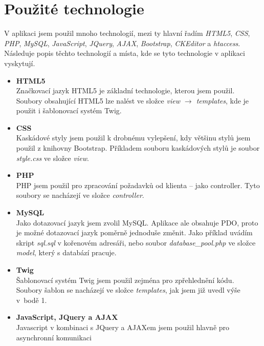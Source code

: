 \documentclass[a4paper]{article}
\begin{document}
	\section{Pou\v{z}it\'e technologie}
		V aplikaci jsem pou\v{z}il mnoho technologi\'i, mezi ty hlavn\'i \v{r}ad\'im \textit{HTML5}, \textit{CSS},
		\textit{PHP}, \textit{MySQL}, \textit{JavaScript}, \textit{JQuery}, \textit{AJAX}, \textit{Bootstrap},
		\textit{CKEditor} a \textit{htaccess}. N\'asleduje popis t\v{e}chto technologi\'i a m\'ista, kde se tyto
		technologie v aplikaci vyskytuj\'i.
		\begin{itemize}
			\item{\textbf{HTML5}\\}
				Zna\v{c}kovac\'i jazyk HTML5 je z\'akladn\'i technologie, kterou jsem pou\v{z}il.
				Soubory obsahuj\'ic\'i HTML5 lze nal\'est ve slo\v{z}ce \textit{view $\rightarrow$ templates},
				kde je pou\v{z}it i \v{s}ablonovac\'i syst\'em Twig.
			\item{\textbf{CSS}\\}
				Kask\'adov\'e styly jsem pou\v{z}il k drobn\'emu vylep\v{s}en\'i, kdy v\v{e}t\v{s}inu
				styl\r{u} jsem pou\v{z}il z knihovny Bootstrap. P\v{r}\'ikladem souboru kask\'adov\'ych
				styl\r{u} je soubor \textit{style.css} ve slo\v{z}ce \textit{view}.
			\item{\textbf{PHP}\\}
				PHP jsem pou\v{z}il pro zpracov\'an\'i po\v{z}adavk\r{u} od klienta -- jako controller.
				Tyto soubory se nach\'azej\'i ve slo\v{z}ce \textit{controller}. 
			\item{\textbf{MySQL}\\}
				Jako dotazovac\'i jazyk jsem zvolil MySQL. Aplikace ale obsahuje PDO, proto je mo\v{z}n\'e
				dotazovac\'i jazyk pom\v{e}rn\v{e} jednodu\v{s}e zm\v{e}nit. Jako p\v{r}\'iklad uv\'ad\'im
				skript \textit{sql.sql} v ko\v{r}enov\'em adres\'a\v{r}i, nebo soubor \textit{database\_pool.php}
				ve slo\v{z}ce \textit{model}, kter\'y s datab\'az\'i pracuje.
			\item{\textbf{Twig}\\}
				\v{S}ablonovac\'i syst\'em Twig jsem pou\v{z}il zejm\'ena pro zp\v{r}ehledn\v{e}n\'i
				k\'odu. Soubory \v{s}ablon se nach\'azej\'i ve slo\v{z}ce \textit{templates},
				jak jsem ji\v{z} uvedl v\'y\v{s}e v~bod\v{e} 1.
			\item{\textbf{JavaScript, JQuery a AJAX}\\}
				Javascript v kombinaci s JQuery a AJAXem jsem pou\v{z}il hlavn\v{e} pro asynchronn\'i komunikaci

\end{itemize}
\end{document}

